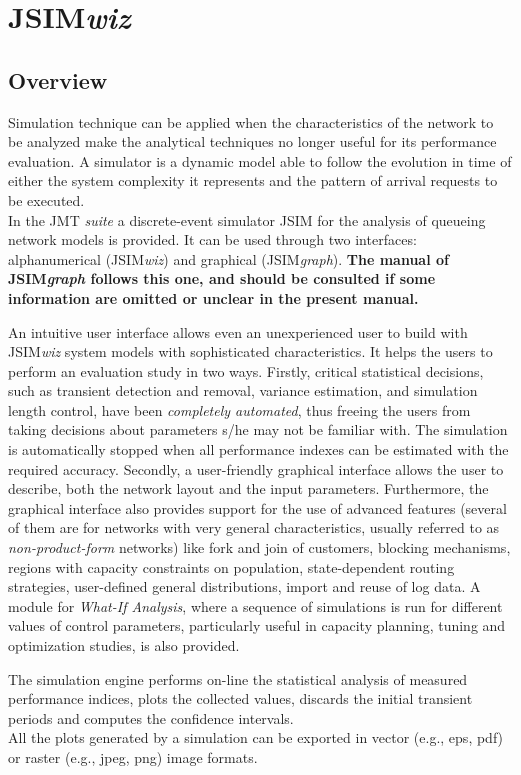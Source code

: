 \chapter{JSIM\emph{wiz}}
\label{cha:jsimwiz}
\section{Overview}
Simulation technique can be applied when the characteristics of
the network to be analyzed make the analytical techniques no
longer useful for its performance evaluation. A simulator is a
dynamic model able to follow the evolution in time of either the
system complexity it represents and the pattern of arrival
requests to be executed.\\
In the JMT \emph{suite} a discrete-event simulator JSIM for the
analysis of queueing network models is provided. It can be used
through two interfaces: alphanumerical (JSIM\emph{wiz}) and
graphical (JSIM\emph{graph}). \textbf{The manual of
JSIM\emph{graph} follows this one, and should be consulted if some
information are omitted or unclear in the present manual.}

An intuitive user interface allows even an unexperienced user to
build with JSIM\emph{wiz} system models with sophisticated
characteristics. It helps the users to perform an evaluation study
in two ways. Firstly, critical statistical decisions, such as
transient detection and removal, variance estimation, and
simulation length control, have been \emph{completely automated},
thus freeing the users from taking decisions about parameters s/he
may not be familiar with. The simulation is automatically stopped
when all performance indexes can be estimated with the required
accuracy. Secondly, a user-friendly graphical interface allows the
user to describe, both the network layout and the input
parameters. Furthermore, the graphical interface also provides
support for the use of advanced features (several of them are for
networks with very general characteristics, usually referred to as
\emph{non-product-form} networks) like fork and join of customers,
blocking mechanisms, regions with capacity constraints on
population, state-dependent routing strategies, user-defined
general distributions, import and reuse of log data. A module for
\emph{What-If Analysis}, where a sequence of simulations is run
for different values of control parameters, particularly useful in
capacity planning, tuning and optimization studies, is also
provided.

The simulation engine performs on-line the statistical analysis of
measured performance indices, plots the collected values, discards
the initial
transient periods and computes the confidence intervals.\\
All the plots generated by a simulation can be exported in vector
(e.g., eps, pdf) or raster (e.g., jpeg,
png) image formats.\\

